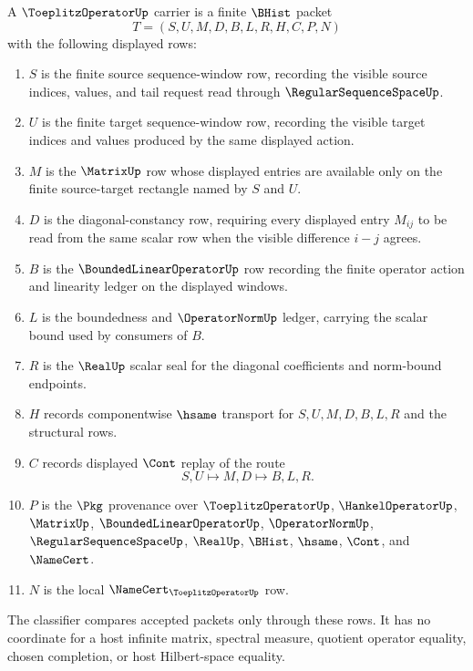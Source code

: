 \begin{definition}
\label{def:toeplitz-operator-carrier}
A $\ToeplitzOperatorUp$ carrier is a finite $\BHist$ packet
$$
T=(S,U,M,D,B,L,R,H,C,P,N)
$$
with the following displayed rows:
\begin{enumerate}
\item $S$ is the finite source sequence-window row, recording the visible source indices, values, and tail request read through $\RegularSequenceSpaceUp$.
\item $U$ is the finite target sequence-window row, recording the visible target indices and values produced by the same displayed action.
\item $M$ is the $\MatrixUp$ row whose displayed entries are available only on the finite source-target rectangle named by $S$ and $U$.
\item $D$ is the diagonal-constancy row, requiring every displayed entry $M_{ij}$ to be read from the same scalar row when the visible difference $i-j$ agrees.
\item $B$ is the $\BoundedLinearOperatorUp$ row recording the finite operator action and linearity ledger on the displayed windows.
\item $L$ is the boundedness and $\OperatorNormUp$ ledger, carrying the scalar bound used by consumers of $B$.
\item $R$ is the $\RealUp$ scalar seal for the diagonal coefficients and norm-bound endpoints.
\item $H$ records componentwise $\hsame$ transport for $S,U,M,D,B,L,R$ and the structural rows.
\item $C$ records displayed $\Cont$ replay of the route
$$
S,U \longmapsto M,D \longmapsto B,L,R .
$$
\item $P$ is the $\Pkg$ provenance over $\ToeplitzOperatorUp$, $\HankelOperatorUp$, $\MatrixUp$, $\BoundedLinearOperatorUp$, $\OperatorNormUp$, $\RegularSequenceSpaceUp$, $\RealUp$, $\BHist$, $\hsame$, $\Cont$, and $\NameCert$.
\item $N$ is the local $\NameCert_{\ToeplitzOperatorUp}$ row.
\end{enumerate}
The classifier compares accepted packets only through these rows. It has no coordinate for a host infinite matrix, spectral measure, quotient operator equality, chosen completion, or host Hilbert-space equality.
\end{definition}


